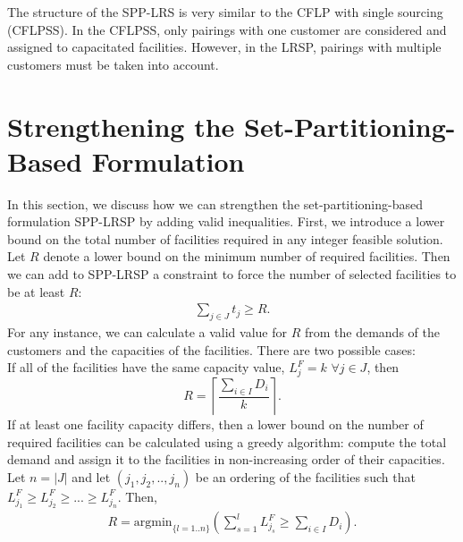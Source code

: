 The structure of the SPP-LRS is very similar to the CFLP with single sourcing (CFLPSS). In the
CFLPSS, only pairings with one customer are considered and assigned to capacitated
facilities. However, in the LRSP, pairings with multiple customers must be taken into account. 


\section{Strengthening the Set-Partitioning-Based Formulation}
\label{StrongForm}
In this section, we discuss how we can strengthen the set-partitioning-based formulation
SPP-LRSP by adding valid inequalities. First, we introduce a lower bound on the total 
number of facilities required in any integer feasible solution.  Let $R$ denote a lower bound
on the minimum number of required facilities. 
Then we can add to SPP-LRSP a constraint to force the number of selected
facilities to be at least $R$:
\begin{eqnarray}
\sum_{j \in J} t_{j} \geq R. \label{lb-open-fac}
\end{eqnarray}
For any instance, we can calculate a valid value for $R$ from the demands of the customers and
the capacities of the facilities. There are two possible cases:\\
 If all of the facilities have the same capacity value, 
$L^F_j = k$ $\forall j \in J$, then 
\begin{equation}
R =\left \lceil \frac{\sum_{i \in I} D_i}{k} \right \rceil . \nonumber
\end{equation}
 If at least one facility capacity differs, then a lower bound 
on the number of required facilities can be calculated using a greedy algorithm: 
compute the total demand and assign it to the facilities in non-increasing order of their 
capacities.  Let $n = |J|$ and let $(j_1,j_2,..,j_n)$ be an ordering of the facilities such that 
$L^F_{j_1}\geq L^F_{j_2} \geq ...\geq L^F_{j_n}$. Then,
\begin{eqnarray*}
 R = \mbox{argmin}_{\{l = 1..n\}} \left (\sum_{s=1}^{l}L^F_{j_s}\geq \sum_{i \in I} D_i \right ).  
\end{eqnarray*}

